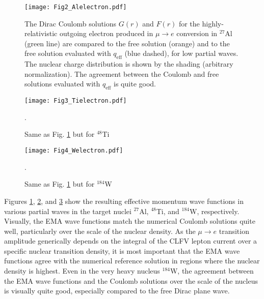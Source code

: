 \documentclass[12pt,letterpaper]{book}
\begin{document}
\begin{figure}
\centering
\texttt{[image: Fig2\_Alelectron.pdf]}
\caption{The Dirac Coulomb solutions $G(r)$ and $F(r)$ for the highly-relativistic outgoing electron produced in $\mu\rightarrow e$ conversion in $^{27}$Al (green line) are compared to the free solution (orange) and to the free solution evaluated with $q_\mathrm{eff}$ (blue dashed), for low partial waves. The nuclear charge distribution is shown by the shading (arbitrary normalization). The agreement between the Coulomb and free solutions evaluated with $q_\mathrm{eff}$ is quite good.}
\label{fig:Alelectron}
\end{figure}
\begin{figure}
\centering
\texttt{[image: Fig3\_Tielectron.pdf]}
\caption{Same as Fig. \ref{fig:Alelectron} but for $^{48}$Ti}.
\label{fig:Tielectron}
\end{figure}
\begin{figure}
\centering
\texttt{[image: Fig4\_Welectron.pdf]}
\caption{Same as Fig. \ref{fig:Alelectron} but for $^{184}$W}.
\label{fig:Welectron}
\end{figure}
Figures \ref{fig:Alelectron}, \ref{fig:Tielectron}, and \ref{fig:Welectron} show the resulting effective momentum wave functions in various partial waves in the target nuclei $^{27}$Al, $^{48}$Ti, and $^{184}$W, respectively. Visually, the EMA wave functions match the numerical Coulomb solutions quite well, particularly over the scale of the nuclear density. As the $\mu\rightarrow e$ transition amplitude generically depends on the integral of the CLFV lepton current over a specific nuclear transition density, it is most important that the EMA wave functions agree with the numerical reference solution in regions where the nuclear density is highest. Even in the very heavy nucleus $^{184}$W, the agreement between the EMA wave functions and the Coulomb solutions over the scale of the nucleus is visually quite good, especially compared to the free Dirac plane wave.
\end{document}

